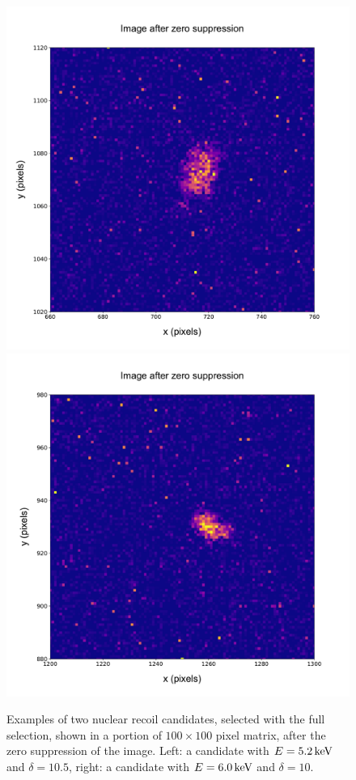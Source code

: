 \begin{figure}[ht]
  \begin{center}
  \includegraphics[width=0.49\linewidth]{figures/pic_run02097_ev59_oriIma_paper}
  \includegraphics[width=0.49\linewidth]{figures/pic_run02097_ev317_oriIma_paper}

  \caption{Examples of two nuclear recoil candidates, selected with  the full selection, shown in a portion of $100\times100$ pixel matrix, after the zero suppression of the image. Left: a candidate
    with $E=5.2\,\textrm{ke\hspace{-.08em}V}$ and $\delta=10.5$, right: a candidate with
    $E=6.0\,\textrm{ke\hspace{-.08em}V}$ and $\delta=10$.  \label{fig:lowEnergyNR}}

\end{center}
\end{figure}

